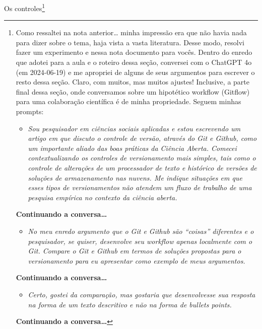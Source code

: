 \documentclass[
  a4paper,
]{article}
\providecommand{\tightlist}{%
  \setlength{\itemsep}{0pt}\setlength{\parskip}{0pt}}\usepackage{longtable,booktabs,array}
\begin{document}
Os controles\footnote{Como ressaltei na nota anterior\ldots{} minha
  impressão era que não havia nada para dizer sobre o tema, haja vista a
  vasta literatura. Desse modo, resolvi fazer um experimento e nessa
  nota documento para vocês. Dentro do enredo que adotei para a aula e o
  roteiro dessa seção, conversei com o ChatGPT 4o (em 2024-06-19) e me
  apropriei de alguns de seus argumentos para escrever o resto dessa
  seção. Claro, com muitos, mas muitos ajustes! Inclusive, a parte final
  dessa seção, onde conversamos sobre um hipotético workflow (Gitflow)
  para uma colaboração científica é de minha propriedade. Seguem minhas
  prompts:

  \begin{itemize}
  \tightlist
  \item
    \emph{Sou pesquisador em ciências sociais aplicadas e estou
    escrevendo um artigo em que discuto o controle de versão, através do
    Git e Github, como um importante aliado das boas práticas da Ciência
    Aberta. Comecei contextualizando os controles de versionamento mais
    simples, tais como o controle de alterações de um processador de
    texto e histórico de versões de soluções de armazenamento nas
    nuvens. Me indique situações em que esses tipos de versionamentos
    não atendem um fluxo de trabalho de uma pesquisa empírica no
    contexto da ciência aberta.}
  \end{itemize}

  \textbf{Continuando a conversa\ldots{}}

  \begin{itemize}
  \tightlist
  \item
    \emph{No meu enredo argumento que o Git e Github são ``coisas''
    diferentes e o pesquisador, se quiser, desenvolve seu workflow
    apenas localmente com o Git. Compare o Git e Github em termos de
    soluções propostas para o versionamento para eu apresentar como
    exemplo de meus argumentos.}
  \end{itemize}

  \textbf{Continuando a conversa\ldots{}}

  \begin{itemize}
  \tightlist
  \item
    \emph{Certo, gostei da comparação, mas gostaria que desenvolvesse
    sua resposta na forma de um texto descritivo e não na forma de
    bullets points.}
  \end{itemize}

  \textbf{Continuando a conversa\ldots{}}

}
\end{document}
